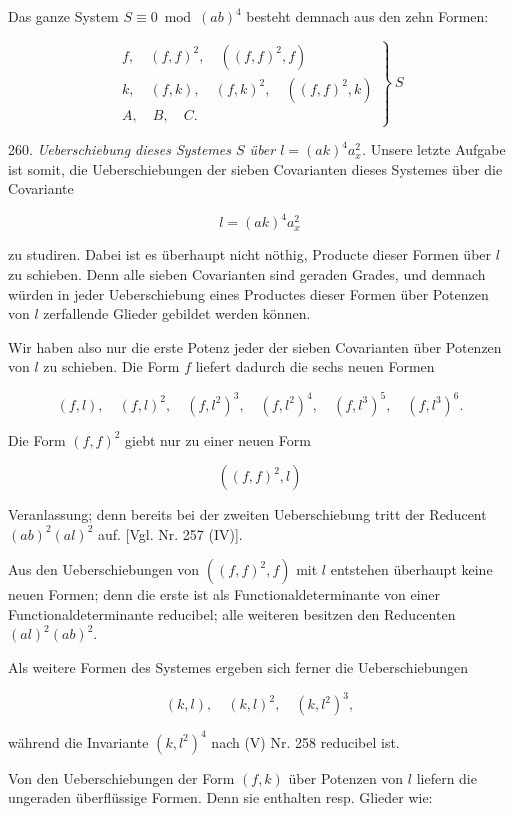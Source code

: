 \documentclass[11pt]{article}
\providecommand{\weberpage}[1]{}
\begin{document}
\weberpage{282}
Das ganze System $S \equiv 0 \bmod (ab)^4$ besteht demnach aus den
zehn Formen:

\[
\left.
\begin{array}{l}
f, \quad (f, f)^2, \quad ((f, f)^2, f)\\[2pt]
k, \quad (f, k), \quad (f, k)^2, \quad ((f, f)^2, k)\\[2pt]
A, \quad B, \quad C.
\end{array}
\right\}\ S
\]

260. \textit{Ueberschiebung dieses Systemes $S$ über $l = (ak)^4 a_x^2$.} Unsere
letzte Aufgabe ist somit, die Ueberschiebungen der sieben Covarianten
dieses Systemes über die Covariante

\[
l = (ak)^4 a_x^2
\]

zu studiren. Dabei ist es überhaupt nicht nöthig, Producte dieser
Formen über $l$ zu schieben. Denn alle sieben Covarianten sind geraden
 Grades, und demnach würden in jeder Ueberschiebung eines Productes
 dieser Formen über Potenzen von $l$ zerfallende Glieder gebildet
 werden können.

Wir haben also nur die erste Potenz jeder der sieben Covarianten
über Potenzen von $l$ zu schieben.
Die Form $f$ liefert dadurch die sechs neuen Formen

\[
(f, l), \quad (f, l)^2, \quad (f, l^2)^3, \quad (f, l^2)^4, \quad (f, l^3)^5, \quad (f, l^3)^6.
\]

Die Form $(f, f)^2$ giebt nur zu einer neuen Form

\[
((f, f)^2, l)
\]

Veranlassung; denn bereits bei der zweiten Ueberschiebung tritt der
Reducent $(ab)^2 (al)^2$ auf. [Vgl. Nr. 257 (IV)].

Aus den Ueberschiebungen von $((f, f)^2, f)$ mit $l$ entstehen überhaupt
 keine neuen Formen; denn die erste ist als Functionaldeterminante
 von einer Functionaldeterminante reducibel; alle weiteren besitzen
 den Reducenten $(al)^2 (ab)^2$.

Als weitere Formen des Systemes ergeben sich ferner die Ueberschiebungen


\[
(k, l), \quad (k, l)^2, \quad (k, l^2)^3,
\]

während die Invariante $(k, l^2)^4$ nach (V) Nr. 258 reducibel ist.

Von den Ueberschiebungen der Form $(f, k)$ über Potenzen von $l$
liefern die ungeraden überflüssige Formen. Denn sie enthalten resp.
Glieder wie:
\end{document}
